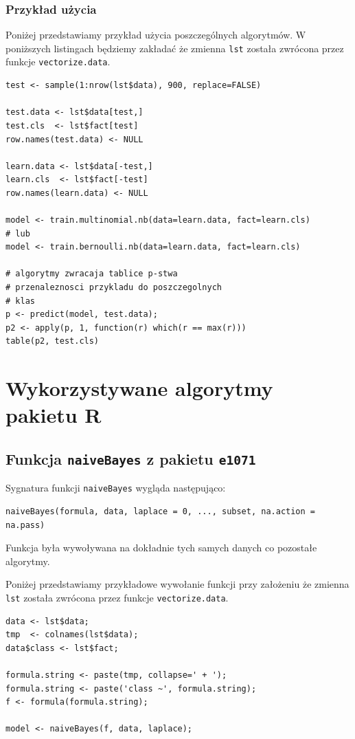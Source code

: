 \documentclass[a4paper,12pt]{article}
\begin{document}
		\subsubsection{Przykład użycia}
		Poniżej przedstawiamy przykład użycia poszczególnych algorytmów.
		W poniższych listingach będziemy zakładać że zmienna \texttt{lst}
		została zwrócona przez funkcje \texttt{vectorize.data}.
		\begin{verbatim}
test <- sample(1:nrow(lst$data), 900, replace=FALSE)

test.data <- lst$data[test,]
test.cls  <- lst$fact[test]
row.names(test.data) <- NULL

learn.data <- lst$data[-test,]
learn.cls  <- lst$fact[-test]
row.names(learn.data) <- NULL

model <- train.multinomial.nb(data=learn.data, fact=learn.cls)
# lub
model <- train.bernoulli.nb(data=learn.data, fact=learn.cls)

# algorytmy zwracaja tablice p-stwa
# przenaleznosci przykladu do poszczegolnych
# klas
p <- predict(model, test.data);
p2 <- apply(p, 1, function(r) which(r == max(r)))
table(p2, test.cls)
		\end{verbatim}
		
		\clearpage
	
\section{Wykorzystywane algorytmy pakietu R}

	\subsection{Funkcja \texttt{naiveBayes} z pakietu \texttt{e1071}}
	
	Sygnatura funkcji \texttt{naiveBayes} wygląda następująco:
\begin{verbatim}
naiveBayes(formula, data, laplace = 0, ..., subset, na.action = na.pass)
\end{verbatim}
	Funkcja była wywoływana na dokładnie tych samych danych co
	pozostałe algorytmy. 
	
	Poniżej przedstawiamy przykładowe 
	wywołanie funkcji przy założeniu że zmienna \texttt{lst}
	została zwrócona przez funkcje \texttt{vectorize.data}.
\begin{verbatim}
data <- lst$data;
tmp  <- colnames(lst$data);
data$class <- lst$fact;

formula.string <- paste(tmp, collapse=' + ');
formula.string <- paste('class ~', formula.string);
f <- formula(formula.string);

model <- naiveBayes(f, data, laplace);
\end{verbatim}
	
\end{document}
